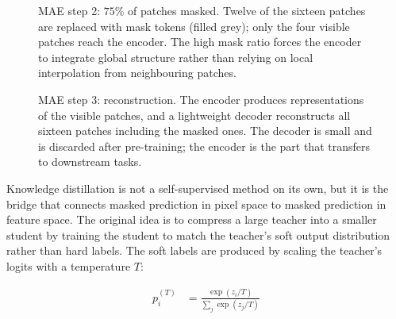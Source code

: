 \begin{figure}
\centering
{}
\caption{MAE step 2: $75\%$ of patches masked. Twelve of the sixteen patches are replaced with mask tokens (filled grey); only the four visible patches reach the encoder. The high mask ratio forces the encoder to integrate global structure rather than relying on local interpolation from neighbouring patches.}
\label{fig:mae_masked}
\end{figure}

\begin{figure}
\centering
{}
\caption{MAE step 3: reconstruction. The encoder produces representations of the visible patches, and a lightweight decoder reconstructs all sixteen patches including the masked ones. The decoder is small and is discarded after pre-training; the encoder is the part that transfers to downstream tasks.}
\label{fig:mae_reconstructed}
\end{figure}

\vspace{1.5em}

\cite{HintonDistillation2015}
Knowledge distillation is not a self-supervised method on its own, but it is the bridge that connects masked prediction in pixel space to masked prediction in feature space.
The original idea is to compress a large teacher into a smaller student by training the student to match the teacher's soft output distribution rather than hard labels.
The soft labels are produced by scaling the teacher's logits with a temperature $T$:

\begin{align*}
    p_i^{(T)} &= \frac{\exp(z_i / T)}{\sum_j \exp(z_j / T)}
\end{align*}

